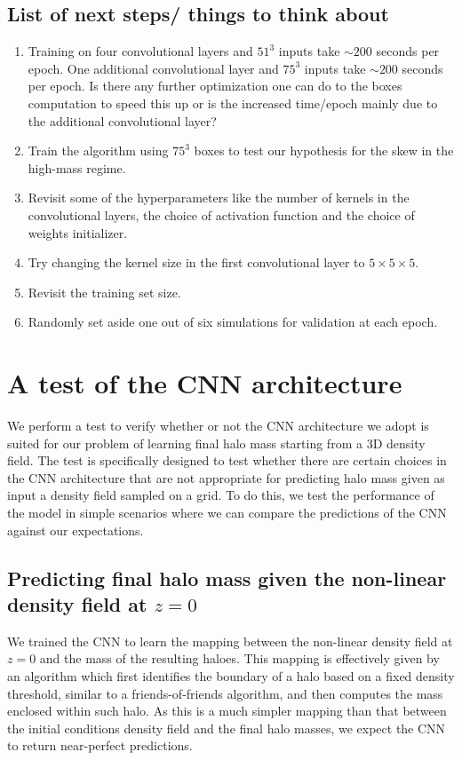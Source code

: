 \documentclass[11pt]{article}
\begin{document}
\subsection{List of next steps/ things to think about}
\begin{enumerate}
\item Training on four convolutional layers and $51^3$ inputs take $\sim 200$ seconds per epoch. One additional convolutional layer and $75^3$ inputs take $\sim 200$ seconds per epoch. Is there any further optimization one can do to the boxes computation to speed this up or is the increased time/epoch mainly due to the additional convolutional layer?
\item Train the algorithm using $75^3$ boxes to test our hypothesis for the skew in the high-mass regime.
\item Revisit some of the hyperparameters like the number of kernels in the convolutional layers, the choice of activation function and the choice of weights initializer.
\item Try changing the kernel size in the first convolutional layer to $5\times5\times5$.
\item Revisit the training set size.
\item Randomly set aside one out of six simulations for validation at each epoch.
\end{enumerate}


\section{A test of the CNN architecture}

We perform a test to verify whether or not the CNN architecture we adopt is suited for our problem of learning final halo mass starting from a 3D density field. The test is specifically designed to test whether there are certain choices in the CNN architecture that are not appropriate for predicting halo mass given as input a density field sampled on a grid. To do this, we test the performance of the model in simple scenarios where we can compare the predictions of the CNN against our expectations.

\subsection{Predicting final halo mass given the non-linear density field at $z=0$}
\label{sec:z0_training}

We trained the CNN to learn the mapping between the non-linear density field at $z=0$ and the mass of the resulting haloes. This mapping is effectively given by an algorithm which first identifies the boundary of a halo based on a fixed density threshold, similar to a friends-of-friends algorithm, and then computes the mass enclosed within such halo. As this is a much simpler mapping than that between the initial conditions density field and the final halo masses, we expect the CNN to return near-perfect predictions. 
\end{document}
